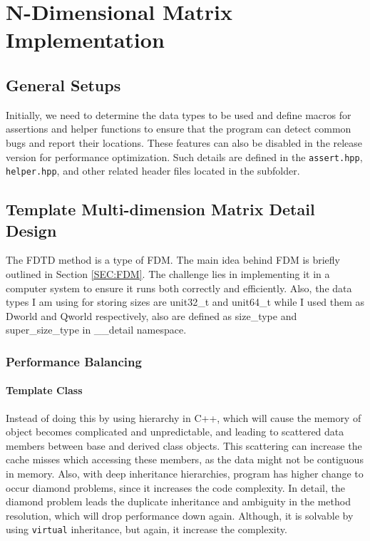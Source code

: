 \section{N-Dimensional Matrix Implementation}
\subsection{General Setups}
Initially, we need to determine the data types to be used and define macros for 
assertions and helper functions to ensure that the program can detect common bugs 
and report their locations. 
These features can also be disabled in the release version for performance optimization. 
Such details are defined in the \texttt{assert.hpp}, \texttt{helper.hpp}, 
and other related header files located in the subfolder.

\subsection{Template Multi-dimension Matrix Detail Design}
The FDTD method is a type of FDM. 
The main idea behind FDM is briefly outlined in Section \ref{SEC:FDM}. 
The challenge lies in implementing it in a computer system to ensure it runs both correctly and efficiently.
Also, the data types I am using for storing sizes are unit32\_t and unit64\_t while I used them 
as Dworld and Qworld respectively, also are defined as size\_type and super\_size\_type in \_\_detail namespace.

\subsubsection{Performance Balancing}
\paragraph{Template Class}
Instead of doing this by using hierarchy in C++, which will cause the memory of object becomes complicated and unpredictable,
and leading to scattered data members between base and derived class objects.
This scattering can increase the cache misses which accessing these members, as the data might not be contiguous in memory.
Also, with deep inheritance hierarchies, program has higher change to occur diamond problems, since it increases the code complexity.
In detail, the diamond problem leads the duplicate inheritance and ambiguity in the method resolution, which will drop performance down again.
Although, it is solvable by using \texttt{virtual} inheritance, but again, it increase the complexity.

